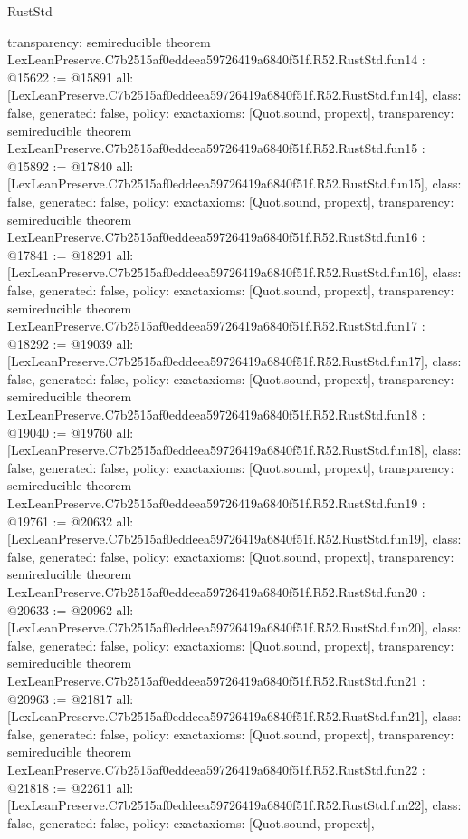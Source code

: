 \begin{lexlean}{RustStd}
\begin{coremodule}
{  transparency: semireducible
}
theorem LexLeanPreserve.C7b2515af0eddeea59726419a6840f51f.R52.RustStd.fun14 : @15622 := @15891 {
  all: [LexLeanPreserve.C7b2515af0eddeea59726419a6840f51f.R52.RustStd.fun14],
  class: false,
  generated: false,
  policy: exact{axioms: [Quot.sound, propext]},
  transparency: semireducible
}
theorem LexLeanPreserve.C7b2515af0eddeea59726419a6840f51f.R52.RustStd.fun15 : @15892 := @17840 {
  all: [LexLeanPreserve.C7b2515af0eddeea59726419a6840f51f.R52.RustStd.fun15],
  class: false,
  generated: false,
  policy: exact{axioms: [Quot.sound, propext]},
  transparency: semireducible
}
theorem LexLeanPreserve.C7b2515af0eddeea59726419a6840f51f.R52.RustStd.fun16 : @17841 := @18291 {
  all: [LexLeanPreserve.C7b2515af0eddeea59726419a6840f51f.R52.RustStd.fun16],
  class: false,
  generated: false,
  policy: exact{axioms: [Quot.sound, propext]},
  transparency: semireducible
}
theorem LexLeanPreserve.C7b2515af0eddeea59726419a6840f51f.R52.RustStd.fun17 : @18292 := @19039 {
  all: [LexLeanPreserve.C7b2515af0eddeea59726419a6840f51f.R52.RustStd.fun17],
  class: false,
  generated: false,
  policy: exact{axioms: [Quot.sound, propext]},
  transparency: semireducible
}
theorem LexLeanPreserve.C7b2515af0eddeea59726419a6840f51f.R52.RustStd.fun18 : @19040 := @19760 {
  all: [LexLeanPreserve.C7b2515af0eddeea59726419a6840f51f.R52.RustStd.fun18],
  class: false,
  generated: false,
  policy: exact{axioms: [Quot.sound, propext]},
  transparency: semireducible
}
theorem LexLeanPreserve.C7b2515af0eddeea59726419a6840f51f.R52.RustStd.fun19 : @19761 := @20632 {
  all: [LexLeanPreserve.C7b2515af0eddeea59726419a6840f51f.R52.RustStd.fun19],
  class: false,
  generated: false,
  policy: exact{axioms: [Quot.sound, propext]},
  transparency: semireducible
}
theorem LexLeanPreserve.C7b2515af0eddeea59726419a6840f51f.R52.RustStd.fun20 : @20633 := @20962 {
  all: [LexLeanPreserve.C7b2515af0eddeea59726419a6840f51f.R52.RustStd.fun20],
  class: false,
  generated: false,
  policy: exact{axioms: [Quot.sound, propext]},
  transparency: semireducible
}
theorem LexLeanPreserve.C7b2515af0eddeea59726419a6840f51f.R52.RustStd.fun21 : @20963 := @21817 {
  all: [LexLeanPreserve.C7b2515af0eddeea59726419a6840f51f.R52.RustStd.fun21],
  class: false,
  generated: false,
  policy: exact{axioms: [Quot.sound, propext]},
  transparency: semireducible
}
theorem LexLeanPreserve.C7b2515af0eddeea59726419a6840f51f.R52.RustStd.fun22 : @21818 := @22611 {
  all: [LexLeanPreserve.C7b2515af0eddeea59726419a6840f51f.R52.RustStd.fun22],
  class: false,
  generated: false,
  policy: exact{axioms: [Quot.sound, propext]},
}
\end{coremodule}
\end{lexlean}
